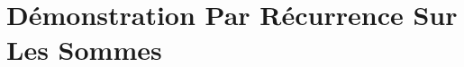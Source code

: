 \documentclass[11pt]{report}
\begin{document}
\section{Démonstration Par Récurrence Sur Les Sommes}
\lipsum[1]
\end{document}
